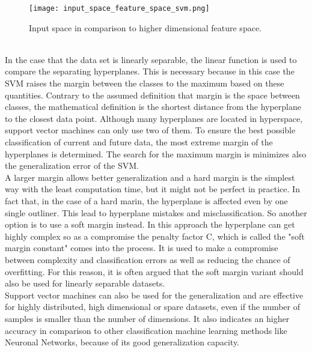 \documentclass[../masterarbeit.tex]{subfiles}
\begin{document}
\begin{figure}[h]
    \centering
    \texttt{[image: input\_space\_feature\_space\_svm.png]}
    \caption{Input space in comparison to higher dimensional feature space.}
\end{figure}
\\
In the case that the data set is linearly separable, the linear function is used to compare the separating hyperplanes. This is necessary because in this case the SVM raises the margin between the classes to the maximum based on these quantities. Contrary to the assumed definition that margin is the space between classes, the mathematical definition is the shortest distance from the hyperplane to the closest data point. Although many hyperplanes are located in hyperspace, support vector machines can only use two of them. To ensure the best possible classification of current and future data, the most extreme margin of the hyperplanes is determined. \autocite[]{SUBASI202091}
The search for the maximum margin is minimizes also the generalization error of the SVM. \autocite[]{SUGUMARAN2007930} \\
A larger margin allows better generalization and a hard margin is the simplest way with the least computation time, but it might not be perfect in practice. In fact that, in the case of a hard marin, the hyperplane is affected even by one single outliner. This lead to hyperplane mistakes and misclassification. So another option is to use a soft margin instead. In this approach the hyperplane can get highly complex so as a compromise the penalty factor C, which is called the "soft margin constant" comes into the process. It is used to make a compromise between complexity and classification errors as well as reducing the chance of overfitting. For this reason, it is often argued that the soft margin variant should also be used for linearly separable datasets. \autocite[]{PISNER2020101} \textcite[]{GHOLAMI2017515} \\
Support vector machines can also be used for the generalization and are effective for highly distributed, high dimensional or spare datasets, even if the number of samples is smaller than the number of dimensions. It also indicates an higher accuracy in comparison to other classification machine learning methods like Neuronal Networks, because of its good generalization capacity. \autocite[]{SUBASI202091} \textcite[]{Scikit-learn-svm:2022} 
\end{document}
